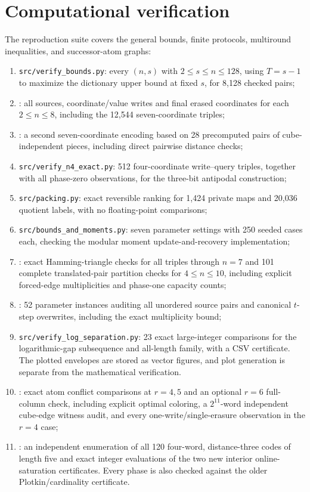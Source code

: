 \documentclass[11pt,a4paper]{article}
\begin{document}
\section{Computational verification}\label{app:computation}
The reproduction suite covers the general bounds, finite protocols, multiround inequalities, and successor-atom graphs:
\begin{enumerate}[label=(\roman*),leftmargin=2em]
\item \texttt{src/verify\_bounds.py}: every $(n,s)$ with $2\le s\le n\le128$, using $T=s-1$ to maximize the dictionary upper bound at fixed $s$, for 8,128 checked pairs;
\item {}: all sources, coordinate/value writes and final erased coordinates for each $2\le n\le8$, including the 12,544 seven-coordinate triples;
\item {}: a second seven-coordinate encoding based on 28 precomputed pairs of cube-independent pieces, including direct pairwise distance checks;
\item \texttt{src/verify\_n4\_exact.py}: 512 four-coordinate write--query triples, together with all phase-zero observations, for the three-bit antipodal construction;
\item \texttt{src/packing.py}: exact reversible ranking for 1,424 private maps and 20,036 quotient labels, with no floating-point comparisons;
\item \texttt{src/bounds\_and\_moments.py}: seven parameter settings with 250 seeded cases each, checking the modular moment update-and-recovery implementation;
\item {}: exact Hamming-triangle checks for all triples through $n=7$ and 101 complete translated-pair partition checks for $4\le n\le10$, including explicit forced-edge multiplicities and phase-one capacity counts;
\item {}: 52 parameter instances auditing all unordered source pairs and canonical $t$-step overwrites, including the exact multiplicity bound;
\item \texttt{src/verify\_log\_separation.py}: 23 exact large-integer comparisons for the logarithmic-gap subsequence and all-length family, with a CSV certificate. The plotted envelopes are stored as vector figures, and plot generation is separate from the mathematical verification.
\item {}: exact atom conflict comparisons at $r=4,5$ and an optional $r=6$ full-column check, including explicit optimal coloring, a $2^{11}$-word independent cube-edge witness audit, and every one-write/single-erasure observation in the $r=4$ case;
\item {}: an independent enumeration of all 120 four-word, distance-three codes of length five and exact integer evaluations of the two new interior online-saturation certificates. Every phase is also checked against the older Plotkin/cardinality certificate.
\end{enumerate}
\end{document}
